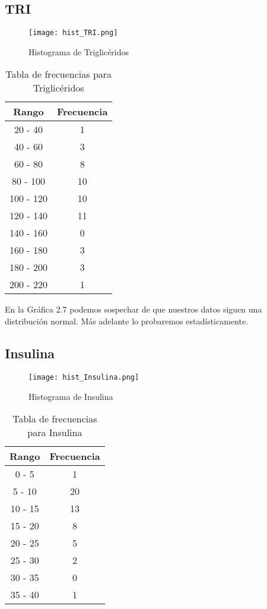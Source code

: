 \documentclass[12pt]{report}
\begin{document}
\subsection{TRI}
\begin{figure}[H]
    \centering
    \texttt{[image: hist\_TRI.png]}
    \caption{Histograma de Triglicéridos}
\end{figure}

\begin{table}[H]
    \centering
    \begin{tabular}{|c|c|}
        \hline
        \textbf{Rango} & \textbf{Frecuencia} \\
        \hline
        20 - 40 & 1 \\
        40 - 60 & 3 \\
        60 - 80 & 8 \\
        80 - 100 & 10 \\
        100 - 120 & 10 \\
        120 - 140 & 11 \\
        140 - 160 & 0 \\
        160 - 180 & 3 \\
        180 - 200 & 3 \\
        200 - 220 & 1 \\
        \hline
    \end{tabular}
    \caption{Tabla de frecuencias para Triglicéridos}
\end{table}
\noindent En la Gráfica 2.7 podemos sospechar de que nuestros datos siguen una distribución normal. Más adelante lo probaremos estadísticamente.

\subsection{Insulina}
\begin{figure}[H]
    \centering
    \texttt{[image: hist\_Insulina.png]}
    \caption{Histograma de Insulina}
\end{figure}

\begin{table}[H]
    \centering
    \begin{tabular}{|c|c|}
        \hline
        \textbf{Rango} & \textbf{Frecuencia} \\
        \hline
        0 - 5 & 1 \\
        5 - 10 & 20 \\
        10 - 15 & 13 \\
        15 - 20 & 8 \\
        20 - 25 & 5 \\
        25 - 30 & 2 \\
        30 - 35 & 0 \\
        35 - 40 & 1 \\
        \hline
    \end{tabular}
    \caption{Tabla de frecuencias para Insulina}
\end{table}
\end{document}
